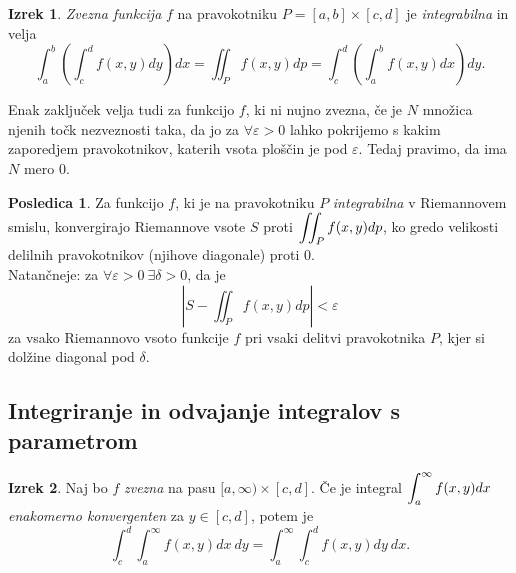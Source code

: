 \documentclass[11pt]{article}
\theoremstyle{definition}
\theoremstyle{definition}
\theoremstyle{definition}
\newtheorem{izrek}{Izrek}[section]
\newtheorem*{posledica}{Posledica}
\begin{document}
\begin{izrek}

\textit{Zvezna funkcija} $f$ na pravokotniku $P = [a, b] \times [c, d]$ je \textit{integrabilna} in velja
\begin{equation}
\int_{a}^{b} \left( \int_{c}^{d} f(x, y) dy \right) dx = \iint_P f(x, y) dp = \int_{c}^{d} \left( \int_{a}^{b} f(x, y) dx \right) dy.
\end{equation}

Enak zaključek velja tudi za funkcijo $f$, ki ni nujno zvezna, če je $N$ množica njenih točk nezveznosti taka, da jo za $\forall \varepsilon > 0$ lahko pokrijemo s kakim zaporedjem pravokotnikov, katerih vsota ploščin je pod $\varepsilon$. Tedaj pravimo, da ima $N$ mero $0$.

\end{izrek}
\vspace{0.5cm}

\begin{posledica}

Za funkcijo $f$, ki je na pravokotniku $P$ \textit{integrabilna} v Riemannovem smislu, konvergirajo Riemannove vsote $S$ proti $\mathlarger{\iint_P f(x, y) dp}$, ko gredo velikosti delilnih pravokotnikov (njihove diagonale) proti $0$. \\

Natančneje: za $\forall \varepsilon > 0 ~\exists \delta > 0$, da je 
$$\left| S - \iint_P f(x, y) dp \right| < \varepsilon$$
za vsako Riemannovo vsoto funkcije $f$ pri vsaki delitvi pravokotnika $P$, kjer si dolžine diagonal pod $\delta$.

\end{posledica}
\vspace{0.5cm}


\subsection{Integriranje in odvajanje integralov s parametrom}
\vspace{0.5cm}

\begin{izrek}

Naj bo $f$ \textit{zvezna} na pasu $[a, \infty) \times [c, d]$. Če je integral $\mathlarger{\int_a^{\infty} f(x, y) dx}$ \textit{enakomerno konvergenten} za $y \in [c, d]$, potem je
$$\int_c^d \int_a^{\infty} f(x, y) dx ~dy = \int_a^{\infty} \int_c^d f(x, y) dy ~dx.$$

\end{izrek}
\vspace{0.5cm}
\end{document}
